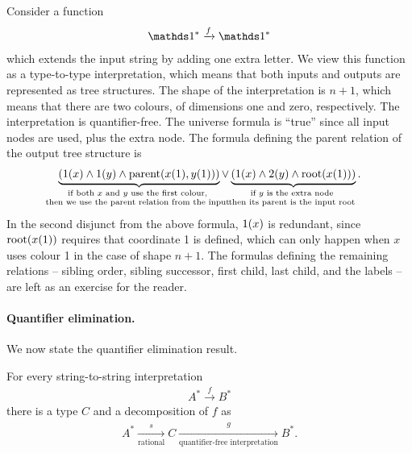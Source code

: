 \begin{myexample}
    Consider a function 
    \begin{align*}
    \onetype^* \xrightarrow f \onetype^*
    \end{align*}
    which extends the input string by adding one extra letter. We view this function as a type-to-type interpretation, which means that both inputs and outputs are represented as tree structures. The shape of the interpretation is  $n+1$, which means that there are two colours, of dimensions one and zero, respectively. The interpretation is quantifier-free.
    The universe formula is ``true'' since all input nodes are used, plus the extra node. The formula defining the parent relation of the output tree structure is
    \begin{align*}
    \myunderbrace{(\summand 1 x \land \summand 1 y \land \parent(x(1),y(1)))}{if both $x$ and $y$ use the first colour, \\ then we use the parent relation from the input} \lor
    \myunderbrace{(\summand 1 x \land \summand 2 y \land \rootrel(x(1)))}{if $y$ is the extra node \\  then its parent is the input root}.
    \end{align*}
    In the second disjunct from the above formula, $1(x)$ is redundant,  since $\mathrm{root}(x(1))$ requires that  coordinate 1 is defined, which can only happen when $x$ uses  colour 1 in the case of shape $n+1$. The formulas defining the remaining relations -- sibling order, sibling successor, first child, last child, and the labels -- are left as an exercise for the reader.
\end{myexample}




    
\paragraph*{Quantifier elimination.} We now state the quantifier elimination result.

\begin{lemma}\label{lem:quantifier-free-interpretation-decomposition}
For every string-to-string \mso interpretation
   \begin{align*}
   A^* \xrightarrow f B^*
   \end{align*}
   there is a type $C$ and a decomposition of $f$ as 
   \begin{align*}
   A^* \xrightarrow[\text{rational}] s C \xrightarrow[\text{quantifier-free interpretation}] g B^*.
   \end{align*}
\end{lemma}

